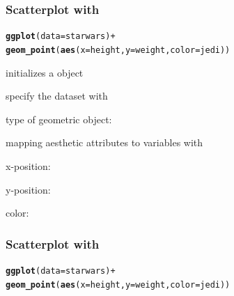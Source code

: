 \documentclass[12pt]{beamer}\usepackage[]{graphicx}\usepackage[]{color}
\makeatletter
\newcommand{\hlopt}[1]{\textcolor[rgb]{0,0,0}{#1}}%
\newcommand{\hlstd}[1]{\textcolor[rgb]{0.345,0.345,0.345}{#1}}%
\newcommand{\hlkwc}[1]{\textcolor[rgb]{0.333,0.667,0.333}{#1}}%
\newcommand{\hlkwd}[1]{\textcolor[rgb]{0.737,0.353,0.396}{\textbf{#1}}}%
\newenvironment{kframe}{%
 \def\at@end@of@kframe{}%
 \ifinner\ifhmode%
  \def\at@end@of@kframe{\end{minipage}}%
  \begin{minipage}{\columnwidth}%
 \fi\fi%
 \def\FrameCommand##1{\hskip\@totalleftmargin \hskip-\fboxsep
 \colorbox{shadecolor}{##1}\hskip-\fboxsep
     \hskip-\linewidth \hskip-\@totalleftmargin \hskip\columnwidth}%
 \MakeFramed {\advance\hsize-\width
   \@totalleftmargin\z@ \linewidth\hsize
   \@setminipage}}%
 {\par\unskip\endMakeFramed%
 \at@end@of@kframe}
\newenvironment{knitrout}{}{} %
\makeatother
\begin{document}

\begin{frame}[fragile]
\frametitle{Scatterplot with }
\begin{knitrout}\footnotesize
{}\color{fgcolor}\begin{kframe}
\begin{alltt}
\hlkwd{ggplot}\hlstd{(}\hlkwc{data} \hlstd{= starwars)} \hlopt{+}
  \hlkwd{geom_point}\hlstd{(}\hlkwd{aes}\hlstd{(}\hlkwc{x} \hlstd{= height,} \hlkwc{y} \hlstd{= weight,} \hlkwc{color} \hlstd{= jedi))}
\end{alltt}
\end{kframe}
\end{knitrout}

\pause
\bi
  \item {\hilit {}} initializes a  object
  \item specify the dataset with {\mdlit {}}
  \item type of geometric object: {\hilit {}}
  \item mapping aesthetic attributes to variables with {\hilit {}}
  \bi
    \item x-position: 
    \item y-position: 
    \item color: 
  \ei
\ei
\end{frame}


\begin{frame}[fragile]
\frametitle{Scatterplot with }
\begin{knitrout}\scriptsize
{}\color{fgcolor}\begin{kframe}
\begin{alltt}
\hlkwd{ggplot}\hlstd{(}\hlkwc{data} \hlstd{= starwars)} \hlopt{+}
  \hlkwd{geom_point}\hlstd{(}\hlkwd{aes}\hlstd{(}\hlkwc{x} \hlstd{= height,} \hlkwc{y} \hlstd{= weight,} \hlkwc{color} \hlstd{= jedi))}
\end{alltt}


{\ttfamily\noindent\bfseries\color{errorcolor}{\#\# Error in ggplot(data = starwars): object 'starwars' not found}}\end{kframe}
\end{knitrout}
\end{frame}
\end{document}
